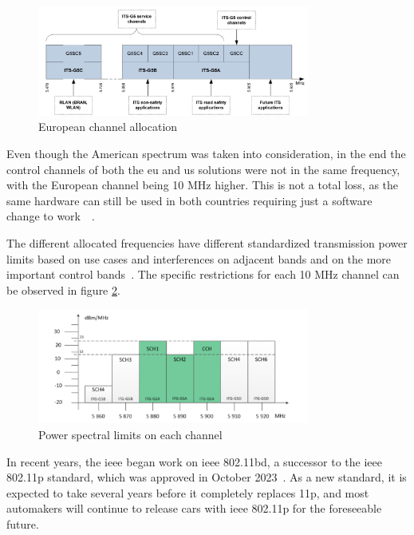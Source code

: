 \begin{figure}[htbp]
    \centering
    \includegraphics[width=0.8\textwidth]{Chapters/Figures/VANETs/European_its_channels.png}
   	\caption{European  channel allocation~\cite{soriga_its-g5_2012}}
   	\label{fig:EU_channels}
\end{figure}

Even though the American spectrum was taken into consideration, in the end the control channels of both the \gls{eu} and \gls{us} solutions were not in the same frequency, with the European channel being 10 MHz higher. This is not a total loss, as the same hardware can still be used in both countries requiring just a software change to work~\cite{harri_multi-channel_2015}~\cite{asselin-miller_study_2016}.

The different allocated frequencies have different standardized transmission power limits based on use cases and interferences on adjacent bands and on the more important control bands~\cite{festag_cooperative_2014}. The specific restrictions for each 10 MHz channel can be observed in figure \ref{fig:EU_channet_restriction}.

\begin{figure}[htbp]
    \centering
    \includegraphics[width=0.8\textwidth]{Chapters/Figures/VANETs/European_its_channels_restrictions.png}
   	\caption{Power spectral limits on each  channel~\cite{harri_multi-channel_2015}}
   	\label{fig:EU_channet_restriction}
\end{figure}

In recent years, the \gls{ieee} began work on \gls{ieee} 802.11bd, a successor to the \gls{ieee} 802.11p standard, which was approved in October 2023~\cite{noauthor_ieee_2023}. As a new standard, it is expected to take several years before it completely replaces 11p, and most automakers will continue to release cars with \gls{ieee} 802.11p for the foreseeable future.

